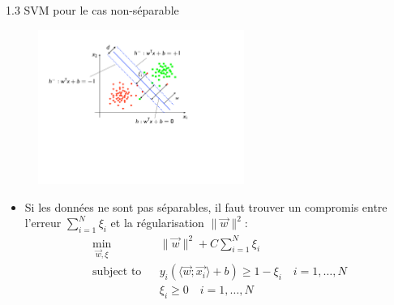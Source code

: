 \begin{frame}{1.3 SVM pour le cas non-séparable}
  \begin{figure}[htb]
    \includegraphics[width=0.6\textwidth]{figures/SVM3.pdf}
  \end{figure}
  \begin{itemize}
    \item Si les données ne sont pas séparables, il faut trouver un compromis entre l'erreur $\sum_{i=1}^{N}\xi_i$ et la régularisation $\|\overrightarrow{w}\|^2$:
    \begin{eqnarray*}
      \min_{\overrightarrow{w},\xi} & & \|\overrightarrow{w}\|^2 + C \sum_{i=1}^{N}\xi_i\\
      \mbox{subject to} & & y_i(\langle \overrightarrow{w};\overrightarrow{x_i} \rangle + b) \geq 1 - \xi_i \quad i = 1, \ldots, N \\
      & & \xi_i \geq 0 \quad i = 1, \ldots, N
    \end{eqnarray*}
  \end{itemize}
\end{frame}

